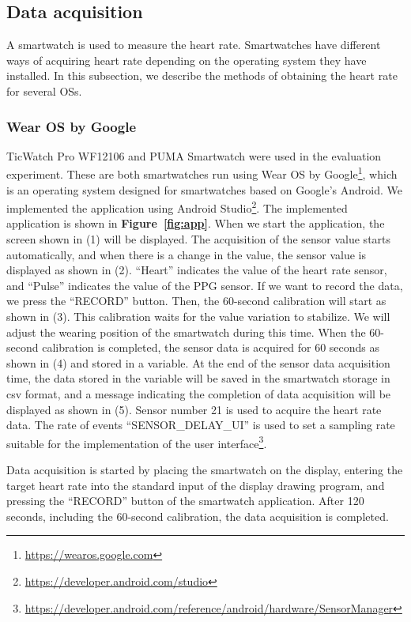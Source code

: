 \documentclass[sigchi,authordraft]{acmart}
\newcommand\figref[1]{\textbf{Figure~\ref{fig:#1}}}
\begin{document}
\subsection{Data acquisition}
\label{subsec:data_acquisition}
A smartwatch is used to measure the heart rate. Smartwatches have different ways of acquiring heart rate depending on the operating system they have installed. In this subsection, we describe the methods of obtaining the heart rate for several OSs.

\subsubsection{Wear OS by Google}
\label{subsec:wearos}
TicWatch Pro WF12106 and PUMA Smartwatch were used in the evaluation experiment. These are both smartwatches run using Wear OS by Google\footnote{\url{https://wearos.google.com}}, which is an operating system designed for smartwatches based on Google's Android. We implemented the application using Android Studio\footnote{\url{https://developer.android.com/studio}}. The implemented application is shown in \figref{app}. When we start the application, the screen shown in (1) will be displayed. The acquisition of the sensor value starts automatically, and when there is a change in the value, the sensor value is displayed as shown in (2). ``Heart'' indicates the value of the heart rate sensor, and ``Pulse'' indicates the value of the PPG sensor. If we want to record the data, we press the ``RECORD'' button. Then, the 60-second calibration will start as shown in (3). This calibration waits for the value variation to stabilize. We will adjust the wearing position of the smartwatch during this time. When the 60-second calibration is completed, the sensor data is acquired for 60 seconds as shown in (4) and stored in a variable. At the end of the sensor data acquisition time, the data stored in the variable will be saved in the smartwatch storage in csv format, and a message indicating the completion of data acquisition will be displayed as shown in (5). Sensor number 21 is used to acquire the heart rate data. The rate of events ``SENSOR\_DELAY\_UI'' is used to set a sampling rate suitable for the implementation of the user interface\footnote{\url{https://developer.android.com/reference/android/hardware/SensorManager}}.\par

Data acquisition is started by placing the smartwatch on the display, entering the target heart rate into the standard input of the display drawing program, and pressing the ``RECORD'' button of the smartwatch application. After 120 seconds, including the 60-second calibration, the data acquisition is completed.\par
\end{document}
